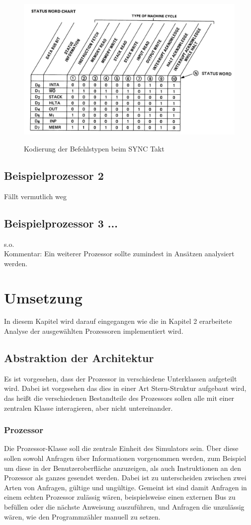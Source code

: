 \documentclass[12pt]{article}
\begin{document}
\begin{figure}[h]
\caption{Kodierung der Befehlstypen beim SYNC Takt}
\centering
\includegraphics[width=15cm]{Bilder/Intel8080_DataLines}
\label{fig:Intel8080_DataLines}
\end{figure}


\subsection{Beispielprozessor 2}
Fällt vermutlich weg
\subsection{Beispielprozessor 3 ...}
s.o.\\
Kommentar: Ein weiterer Prozessor sollte zumindest in Ansätzen analysiert werden.

\newpage

\section{Umsetzung}
In diesem Kapitel wird darauf eingegangen wie die in Kapitel 2 erarbeitete Analyse der ausgewählten Prozessoren implementiert wird.
\subsection{Abstraktion der Architektur}
Es ist vorgesehen, dass der Prozessor in verschiedene Unterklassen aufgeteilt wird. Dabei ist vorgesehen das dies in einer Art Stern-Struktur aufgebaut wird, das heißt die verschiedenen Bestandteile des Prozessors sollen alle mit einer zentralen Klasse interagieren, aber nicht untereinander.
\subsubsection{Prozessor}
Die Prozessor-Klasse soll die zentrale Einheit des Simulators sein. Über diese sollen sowohl Anfragen über Informationen vorgenommen werden, zum Beispiel um diese in der Benutzeroberfläche anzuzeigen, als auch Instruktionen an den Prozessor als ganzes gesendet werden. Dabei ist zu unterscheiden zwischen zwei Arten von Anfragen, gültige und ungültige. Gemeint ist sind damit Anfragen in einem echten Prozessor zulässig wären, beispielsweise einen externen Bus zu befüllen oder die nächste Anweisung auszuführen, und Anfragen die unzulässig wären, wie den Programmzähler manuell zu setzen.
\end{document}
